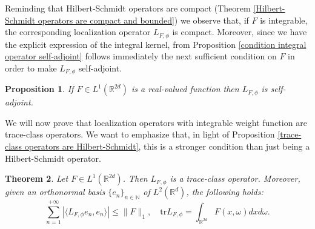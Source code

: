 \documentclass[corpo=11pt, stile=classica, tipotesi=custom,
greek, evenboxes, english]{toptesi}
\numberwithin{equation}{chapter}
\newtheorem{teo}{Theorem}[chapter] %
\newtheorem{prop}[teo]{Proposition}
\theoremstyle{definition}
\theoremstyle{remark}
\newcommand{\R}{\mathbb{R}} %
\newcommand{\N}{\mathbb{N}} %
\begin{document}
Reminding  that Hilbert-Schmidt operators are compact (Theorem \ref{Hilbert-Schmidt operators are compact and bounded}) we observe that, if $F$ is integrable, the corresponding localization operator $L_{F,\phi}$ is compact. Moreover, since we have the explicit expression of the integral kernel, from Proposition \ref{condition integral operator self-adjoint} follows immediately the next sufficient condition on $F$ in order to make $L_{F,\phi}$ self-adjoint.
\begin{prop}\label{condition localization operator self-adjoint}
	If $F \in L^1(\R^{2d})$ is a real-valued function then $L_{F,\phi}$ is self-adjoint.
\end{prop}
We will now prove that localization operators with integrable weight function are trace-class operators. We want to emphasize that, in light of Proposition \ref{trace-class operators are Hilbert-Schmidt}, this is a stronger condition than just being a Hilbert-Schmidt operator.
\begin{teo}\label{F integrable L_F trace-class}
	Let $F \in L^1(\R^{2d})$. Then $L_{F,\phi}$ is a trace-class operator. Moreover, given an orthonormal basis $\{e_n\}_{n \in \N}$ of $L^2(\R^d)$, the following holds:
	\begin{equation}\label{trace of localization operators}
		\sum_{n=1}^{+\infty} |\langle L_{F,\phi}e_n,e_n \rangle| \leq \|F\|_1, \quad \mathrm{tr}L_{F,\phi} = \int_{\R^{2d}} F(x,\omega) dx d\omega.
	\end{equation}
\end{teo}
\end{document}
